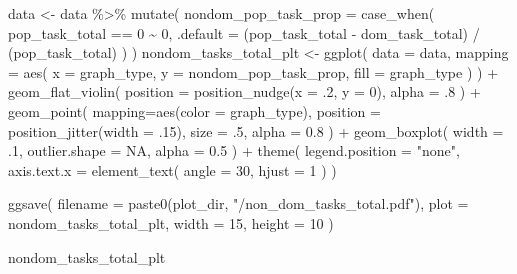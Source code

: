 \documentclass[
]{book}
\newenvironment{Shaded}{\begin{snugshade}}{\end{snugshade}}
\newcommand{\AttributeTok}[1]{\textcolor[rgb]{0.77,0.63,0.00}{#1}}
\newcommand{\ConstantTok}[1]{\textcolor[rgb]{0.00,0.00,0.00}{#1}}
\newcommand{\DecValTok}[1]{\textcolor[rgb]{0.00,0.00,0.81}{#1}}
\newcommand{\FloatTok}[1]{\textcolor[rgb]{0.00,0.00,0.81}{#1}}
\newcommand{\FunctionTok}[1]{\textcolor[rgb]{0.00,0.00,0.00}{#1}}
\newcommand{\NormalTok}[1]{#1}
\newcommand{\OtherTok}[1]{\textcolor[rgb]{0.56,0.35,0.01}{#1}}
\newcommand{\SpecialCharTok}[1]{\textcolor[rgb]{0.00,0.00,0.00}{#1}}
\newcommand{\StringTok}[1]{\textcolor[rgb]{0.31,0.60,0.02}{#1}}
\begin{document}
\begin{Shaded}
\begin{Highlighting}[]
\NormalTok{data }\OtherTok{\textless{}{-}}\NormalTok{ data }\SpecialCharTok{\%\textgreater{}\%}
  \FunctionTok{mutate}\NormalTok{(}
    \AttributeTok{nondom\_pop\_task\_prop =} \FunctionTok{case\_when}\NormalTok{(}
\NormalTok{      pop\_task\_total }\SpecialCharTok{==} \DecValTok{0} \SpecialCharTok{\textasciitilde{}} \DecValTok{0}\NormalTok{,}
      \AttributeTok{.default =}\NormalTok{ (pop\_task\_total }\SpecialCharTok{{-}}\NormalTok{ dom\_task\_total) }\SpecialCharTok{/}\NormalTok{ (pop\_task\_total)}
\NormalTok{    )}
\NormalTok{  )}
\NormalTok{nondom\_tasks\_total\_plt }\OtherTok{\textless{}{-}} \FunctionTok{ggplot}\NormalTok{(}
    \AttributeTok{data =}\NormalTok{ data,}
    \AttributeTok{mapping =} \FunctionTok{aes}\NormalTok{(}
      \AttributeTok{x =}\NormalTok{ graph\_type,}
      \AttributeTok{y =}\NormalTok{ nondom\_pop\_task\_prop,}
      \AttributeTok{fill =}\NormalTok{ graph\_type}
\NormalTok{    )}
\NormalTok{  ) }\SpecialCharTok{+}
  \FunctionTok{geom\_flat\_violin}\NormalTok{(}
    \AttributeTok{position =} \FunctionTok{position\_nudge}\NormalTok{(}\AttributeTok{x =}\NormalTok{ .}\DecValTok{2}\NormalTok{, }\AttributeTok{y =} \DecValTok{0}\NormalTok{),}
    \AttributeTok{alpha =}\NormalTok{ .}\DecValTok{8}
\NormalTok{  ) }\SpecialCharTok{+}
  \FunctionTok{geom\_point}\NormalTok{(}
    \AttributeTok{mapping=}\FunctionTok{aes}\NormalTok{(}\AttributeTok{color =}\NormalTok{ graph\_type),}
    \AttributeTok{position =} \FunctionTok{position\_jitter}\NormalTok{(}\AttributeTok{width =}\NormalTok{ .}\DecValTok{15}\NormalTok{),}
    \AttributeTok{size =}\NormalTok{ .}\DecValTok{5}\NormalTok{,}
    \AttributeTok{alpha =} \FloatTok{0.8}
\NormalTok{  ) }\SpecialCharTok{+}
  \FunctionTok{geom\_boxplot}\NormalTok{(}
    \AttributeTok{width =}\NormalTok{ .}\DecValTok{1}\NormalTok{,}
    \AttributeTok{outlier.shape =} \ConstantTok{NA}\NormalTok{,}
    \AttributeTok{alpha =} \FloatTok{0.5}
\NormalTok{  ) }\SpecialCharTok{+}
  \FunctionTok{theme}\NormalTok{(}
    \AttributeTok{legend.position =} \StringTok{"none"}\NormalTok{,}
    \AttributeTok{axis.text.x =} \FunctionTok{element\_text}\NormalTok{(}
      \AttributeTok{angle =} \DecValTok{30}\NormalTok{,}
      \AttributeTok{hjust =} \DecValTok{1}
\NormalTok{    )}
\NormalTok{  )}

\FunctionTok{ggsave}\NormalTok{(}
  \AttributeTok{filename =} \FunctionTok{paste0}\NormalTok{(plot\_dir, }\StringTok{"/non\_dom\_tasks\_total.pdf"}\NormalTok{),}
  \AttributeTok{plot =}\NormalTok{ nondom\_tasks\_total\_plt,}
  \AttributeTok{width =} \DecValTok{15}\NormalTok{,}
  \AttributeTok{height =} \DecValTok{10}
\NormalTok{)}

\NormalTok{nondom\_tasks\_total\_plt}
\end{Highlighting}
\end{Shaded}
\end{document}
